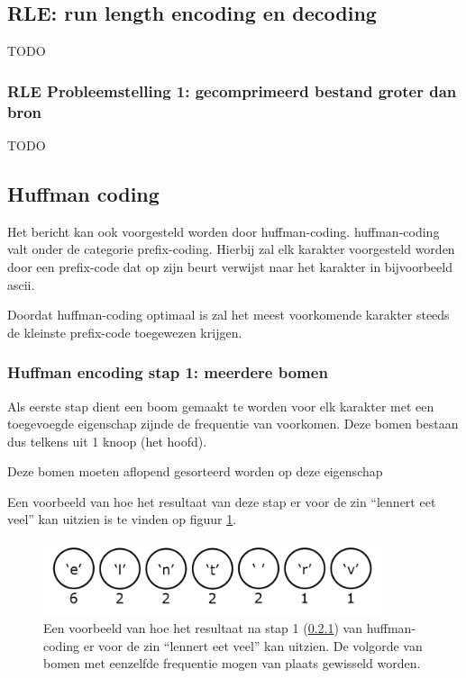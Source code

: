 \subsection{RLE: run length encoding en decoding}
\label{sec:primitieve-technieken-voorbeeld-rle}
TODO

\subsubsection{RLE Probleemstelling 1: gecomprimeerd bestand groter dan bron}
\label{sec:primitieve-technieken-voorbeeld-rle-probleem-1}
TODO

\subsection{Huffman coding}
\label{sec:primitieve-technieken-voorbeeld-huffman-encoding}
Het bericht kan ook voorgesteld worden door \gls{huffman-coding}. \gls{huffman-coding} valt onder de categorie \gls{prefix-coding}. Hierbij zal elk karakter voorgesteld worden door een \gls{prefix-code} dat op zijn beurt verwijst naar het karakter in bijvoorbeeld \gls{ascii}. 

Doordat \gls{huffman-coding} optimaal is zal het meest voorkomende karakter steeds de kleinste \gls{prefix-code} toegewezen krijgen.

\subsubsection{Huffman encoding stap 1: meerdere bomen}
\label{sec:primitieve-technieken-voorbeeld-huffman-encoding-1}
Als eerste stap dient een boom gemaakt te worden voor elk karakter met een toegevoegde eigenschap zijnde de frequentie van voorkomen. Deze bomen bestaan dus telkens uit 1 knoop (het hoofd).

Deze bomen moeten aflopend gesorteerd worden op deze eigenschap 

Een voorbeeld van hoe het resultaat van deze stap er voor de zin “lennert eet veel” kan uitzien is te vinden op figuur \ref{fig:huffman-stap-1}.

\FloatBarrier
\begin{figure}[h!]
	\includegraphics[width=100mm]{img/literatuurstudie/huffman-stap-1.png}
	\caption{Een voorbeeld van hoe het resultaat na stap 1 (\ref{sec:primitieve-technieken-voorbeeld-huffman-encoding-1}) van \gls{huffman-coding} er voor de zin “lennert eet veel” kan uitzien. De volgorde van bomen met eenzelfde frequentie mogen van plaats gewisseld worden.}
	\label{fig:huffman-stap-1}
\end{figure}
\FloatBarrier

